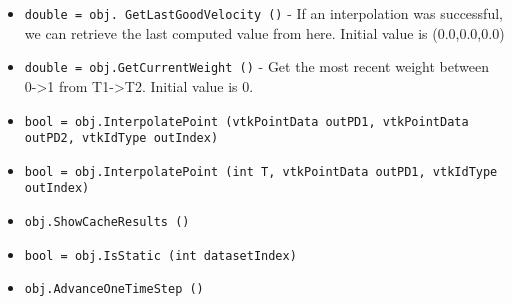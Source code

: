 \begin{itemize}
\item  \verb|double = obj. GetLastGoodVelocity ()| -  If an interpolation was successful, we can retrieve the last computed
 value from here. Initial value is (0.0,0.0,0.0)

\item  \verb|double = obj.GetCurrentWeight ()| -  Get the most recent weight between 0->1 from T1->T2. Initial value is 0.

\item  \verb|bool = obj.InterpolatePoint (vtkPointData outPD1, vtkPointData outPD2, vtkIdType outIndex)|

\item  \verb|bool = obj.InterpolatePoint (int T, vtkPointData outPD1, vtkIdType outIndex)|

\item  \verb|obj.ShowCacheResults ()|

\item  \verb|bool = obj.IsStatic (int datasetIndex)|

\item  \verb|obj.AdvanceOneTimeStep ()|

\end{itemize}

